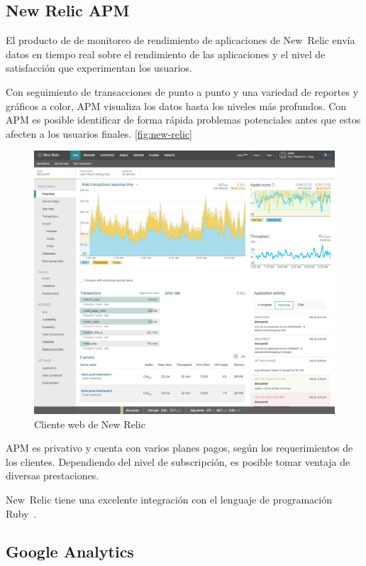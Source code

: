\subsection{New Relic APM}

El producto de  de monitoreo de rendimiento de aplicaciones de
New~Relic envía datos en tiempo real sobre el rendimiento de las aplicaciones
 y el nivel de satisfacción que experimentan los usuarios.

Con seguimiento de transacciones de punto a punto y una variedad de reportes y
gráficos a color, APM visualiza los datos hasta los niveles más profundos. Con
APM es posible identificar de forma rápida problemas potenciales antes que
estos afecten a los usuarios finales. \autoref{fig:new-relic}

\begin{figure}
  \includegraphics[width=\linewidth]{src/images/anexos/newrelic.png}
  \caption{Cliente web de New Relic}
  \label{fig:new-relic}
\end{figure}

APM es  privativo y cuenta con varios planes pagos, según los
requerimientos de los clientes. Dependiendo del nivel de subscripción, es
posible tomar ventaja de diversas prestaciones.

New~Relic tiene una excelente integración con el lenguaje de programación
Ruby~\cite{newrelic}.

\subsection{Google Analytics}

